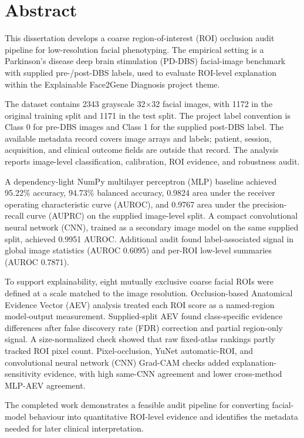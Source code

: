 \section*{\centering Abstract}

This dissertation develops a coarse region-of-interest (ROI) occlusion audit pipeline for low-resolution facial phenotyping. The empirical setting is a Parkinson's disease deep brain stimulation (PD-DBS) facial-image benchmark with supplied pre-/post-DBS labels, used to evaluate ROI-level explanation within the Explainable Face2Gene Diagnosis project theme.


The dataset contains 2343 grayscale 32$\times$32 facial images, with 1172 in the original training split and 1171 in the test split. The project label convention is Class 0 for pre-DBS images and Class 1 for the supplied post-DBS label. The available metadata record covers image arrays and labels; patient, session, acquisition, and clinical outcome fields are outside that record. The analysis reports image-level classification, calibration, ROI evidence, and robustness audit.


A dependency-light NumPy multilayer perceptron (MLP) baseline achieved 95.22\% accuracy, 94.73\% balanced accuracy, 0.9824 area under the receiver operating characteristic curve (AUROC), and 0.9767 area under the precision-recall curve (AUPRC) on the supplied image-level split. A compact convolutional neural network (CNN), trained as a secondary image model on the same supplied split, achieved 0.9951 AUROC. Additional audit found label-associated signal in global image statistics (AUROC 0.6095) and per-ROI low-level summaries (AUROC 0.7871).


To support explainability, eight mutually exclusive coarse facial ROIs were defined at a scale matched to the image resolution. Occlusion-based Anatomical Evidence Vector (AEV) analysis treated each ROI score as a named-region model-output measurement. Supplied-split AEV found class-specific evidence differences after false discovery rate (FDR) correction and partial region-only signal. A size-normalized check showed that raw fixed-atlas rankings partly tracked ROI pixel count. Pixel-occlusion, YuNet automatic-ROI, and convolutional neural network (CNN) Grad-CAM checks added explanation-sensitivity evidence, with high same-CNN agreement and lower cross-method MLP-AEV agreement.


The completed work demonstrates a feasible audit pipeline for converting facial-model behaviour into quantitative ROI-level evidence and identifies the metadata needed for later clinical interpretation.

